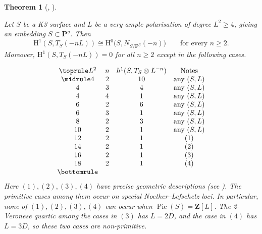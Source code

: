 \documentclass[a4paper,12pt,twoside,reqno]{amsart}
\numberwithin{equation}{section}
\theoremstyle{plain}
\newtheorem{theorem}{Theorem}[section]
\theoremstyle{definition}
\DeclareMathOperator{\Pic}{Pic}
\newcommand{\PP}{\mathbf{P}}
\newcommand{\ZZ}{\mathbf{Z}}
\newcommand{\HH}{\mathrm{H}}
\theoremstyle{plain}
\theoremstyle{definition}
\begin{document}
\begin{theorem} [{\cite[Lemma~3.5 and Theorem~3.6]{DedieuSernesi}, \cite[Lemma~2.3, (5), and Proposition~1.4]{KnutsenNormal}}]\label{prop:knutsen-normal}

Let $S$ be a K3 surface and $L$ be a very ample polarisation of
degree $L^2 \geq 4$, giving an embedding $S\subset\PP^g$. Then
\[
\HH^1(S,T_S(-nL))
\cong
\HH^0\bigl(S,N_{S/\PP^g}(-n)\bigr)
\qquad\text{for every }n\ge2.
\]
Moreover, $\HH^1(S,T_S(-nL))=0$ for all $n \geq 2$ except in the following cases.

\[
\begin{array}{@{}cccc@{}}
\toprule
L^2 & n
& h^1\!\left(S,T_S\otimes L^{-n}\right)
& \text{Notes} \\
\midrule
 4 & 2 & 10 & \text{any }(S,L) \\
 4 & 3 &  4 & \text{any }(S,L) \\
 4 & 4 &  1 & \text{any }(S,L) \\
 6 & 2 &  6 & \text{any }(S,L) \\
 6 & 3 &  1 & \text{any }(S,L) \\
 8 & 2 &  3 & \text{any }(S,L) \\
10 & 2 &  1 & \text{any }(S,L) \\
12 & 2 &  1 & (1) \\
14 & 2 &  1 & (2) \\
16 & 2 &  1 & (3) \\
18 & 2 &  1 & (4) \\
\bottomrule
\end{array}
\]
Here $(1),(2),(3),(4)$ have precise geometric descriptions (see \cite[Theorem~3.6]{DedieuSernesi}). The primitive cases among them occur on special Noether--Lefschetz loci. In particular, none of $(1),(2),(3),(4)$ can occur when $\Pic(S)=\ZZ[L]$. The 2-Veronese quartic among the cases in $(3)$ has $L=2D$, and the case in $(4)$ has $L=3D$, so these two cases are non-primitive.
\end{theorem}
\end{document}
